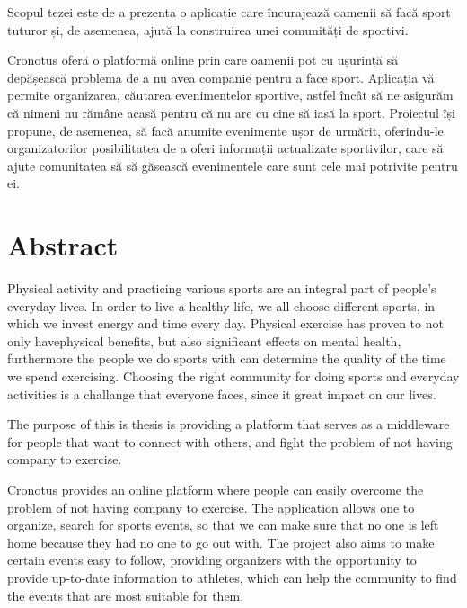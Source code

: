   Scopul tezei este de a prezenta o aplicație care încurajează oamenii să facă sport
  tuturor și, de asemenea, ajută la construirea unei comunități de sportivi.
  
  Cronotus oferă o platformă online prin care oamenii pot cu ușurință
  să depășească problema de a nu avea companie pentru a face sport. Aplicația vă permite organizarea, căutarea evenimentelor sportive, 
  astfel încât să ne asigurăm că nimeni nu rămâne acasă pentru că nu are cu cine să iasă la sport. 
  Proiectul își propune, de asemenea, să facă anumite evenimente ușor de urmărit,
  oferindu-le organizatorilor posibilitatea de a oferi informații actualizate sportivilor, care să ajute comunitatea să
  să găsească evenimentele care sunt cele mai potrivite pentru ei.


\vfill
{}

\chapter*{Abstract}
Physical activity and practicing various sports are an integral part of people's everyday lives.
  In order to live a healthy life, we all choose different sports,
  in which we invest energy and time every day. Physical exercise has proven to not only havephysical benefits, but also significant effects on mental health,
  furthermore the people we do sports with can determine the quality of the time we spend exercising.\cite{warner2017yielding} Choosing the right community for doing sports and everyday 
  activities is a challange that everyone faces, since it great impact on our lives.
  
  The purpose of this is thesis is providing a platform that serves as a middleware for people that want to connect with others,
  and fight the problem of not having company to exercise.
  
  Cronotus provides an online platform where people can easily
  overcome the problem of not having company to exercise. The application allows one to organize, search for sports events,
  so that we can make sure that no one is left home because they had no one to go out with. 
  The project also aims to make certain events easy to follow,
  providing organizers with the opportunity to provide up-to-date information to athletes, which can help the community
  to find the events that are most suitable for them.

\vfill
\dolgozatnyelve
{}